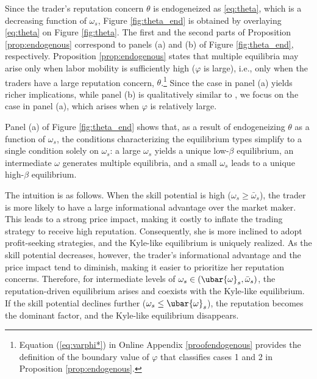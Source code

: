 Since the trader's reputation concern $\theta$ is endogeneized as \eqref{eq:theta}, which is a decreasing function of $\omega_{s}$, Figure \ref{fig:theta_end} is obtained by overlaying \eqref{eq:theta} on Figure \ref{fig:theta}. The first and the second parts of Proposition \ref{prop:endogenous} correspond to panels (a) and (b) of Figure \ref{fig:theta_end}, respectively. Proposition \ref{prop:endogenous} states that multiple equilibria may arise only when labor mobility is sufficiently high ($\varphi$ is large), i.e., only when the traders have a large reputation concern, $\theta$.\footnote{Equation (\ref{eq:varphi*}) in Online Appendix \ref{proofendogenous} provides the definition of the boundary value of $\varphi$ that classifies cases 1 and 2 in Proposition \ref{prop:endogenous}.} Since the case in panel (a) yields richer implications, while panel (b) is qualitatively similar to \citet{kyle1985continuous}, we focus on the case in panel (a), which arises when $\varphi$ is relatively large.

Panel (a) of Figure \ref{fig:theta_end} shows that, as a result of endogeneizing $\theta$ as a function of $\omega_{s}$, the conditions characterizing the equilibrium types simplify to a single condition solely on $\omega_{s}$: a large $\omega_{s}$ yields a unique low-$\beta$ equilibrium, an intermediate $\omega$ generates multiple equilibria, and a small $\omega_{s}$ leads to a unique high-$\beta$ equilibrium.



The intuition is as follows. When the skill potential is high ($\omega_{s}\geq\bar{\omega}_{s}$), the trader is more likely to have a large informational advantage
over the market maker. This leads to a strong price impact, making it costly to inflate the trading strategy to receive high reputation.
Consequently, she is more inclined to adopt profit-seeking strategies, and the Kyle-like equilibrium is uniquely realized. As the skill potential decreases, however, the trader's informational advantage and the price impact tend to diminish, making it easier to prioritize her reputation concerns. Therefore, for intermediate levels of $\omega_{s} \in(\ubar{\omega}_{s},\bar{\omega}_{s})$, the reputation-driven equilibrium arises and coexists with the Kyle-like equilibrium. If the skill potential declines further ($\omega_{s} \leq \ubar{\omega}_{s}$), the reputation becomes the dominant factor, and the Kyle-like equilibrium disappears.

